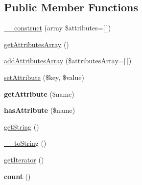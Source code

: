 \subsection*{Public Member Functions}
\begin{DoxyCompactItemize}
\item 
\mbox{\hyperlink{class_pes_1_1_dom_1_1_node_1_1_attributes_1_1_attributes_abstract2_afe55bc1439758d475e70446a774807d9}{\+\_\+\+\_\+construct}} (array \$attributes=\mbox{[}$\,$\mbox{]})
\item 
\mbox{\hyperlink{class_pes_1_1_dom_1_1_node_1_1_attributes_1_1_attributes_abstract2_a777187fb39c10ae49a97e9bd1878bf0f}{get\+Attributes\+Array}} ()
\item 
\mbox{\hyperlink{class_pes_1_1_dom_1_1_node_1_1_attributes_1_1_attributes_abstract2_a80b50df7d001d00c8fc69c4a1aa07f3b}{add\+Attributes\+Array}} (\$attributes\+Array=\mbox{[}$\,$\mbox{]})
\item 
\mbox{\hyperlink{class_pes_1_1_dom_1_1_node_1_1_attributes_1_1_attributes_abstract2_a0510466da552b21cc2be4e4c4119a5bb}{set\+Attribute}} (\$key, \$value)
\item 
\mbox{\label{class_pes_1_1_dom_1_1_node_1_1_attributes_1_1_attributes_abstract2_ae954da422d40fc286691e54679e44c6f}} 
{\bfseries get\+Attribute} (\$name)
\item 
\mbox{\label{class_pes_1_1_dom_1_1_node_1_1_attributes_1_1_attributes_abstract2_ac78ba27a41d0291c61326022489d4986}} 
{\bfseries has\+Attribute} (\$name)
\item 
\mbox{\hyperlink{class_pes_1_1_dom_1_1_node_1_1_attributes_1_1_attributes_abstract2_afde980915cc78c408e6ac75b662e631c}{get\+String}} ()
\item 
\mbox{\hyperlink{class_pes_1_1_dom_1_1_node_1_1_attributes_1_1_attributes_abstract2_a7516ca30af0db3cdbf9a7739b48ce91d}{\+\_\+\+\_\+to\+String}} ()
\item 
\mbox{\hyperlink{class_pes_1_1_dom_1_1_node_1_1_attributes_1_1_attributes_abstract2_a7a9f937c2958e6f4dd7b030f86fb70b7}{get\+Iterator}} ()
\item 
\mbox{\label{class_pes_1_1_dom_1_1_node_1_1_attributes_1_1_attributes_abstract2_ac751e87b3d4c4bf2feb03bee8b092755}} 
{\bfseries count} ()
\end{DoxyCompactItemize}


